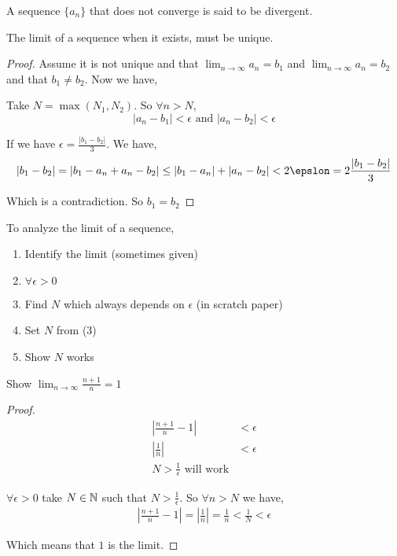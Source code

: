 \begin{definition}
    A sequence $\{a_n\}$ that does not converge is said to be divergent.
\end{definition}

\begin{theorem}
    The limit of a sequence when it exists, must be unique.
\end{theorem}
\begin{proof}
    Assume it is not unique and that $\lim_{n \to \infty} a_n = b_1$ and $\lim_{n \to \infty} a_n = b_2$ and that $b_1 \ne b_2$. Now we have, 


    Take $N = \max(N_1, N_2)$. So $\forall n > N$,
    $$ |a_n - b_1| < \epsilon \text{ and } |a_n - b_2| < \epsilon $$ 

    If we have $\epsilon = \frac{|b_1  - b_2|}{3}$. We have, 
    $$ |b_1 - b_2| = |b_1 - a_n + a_n - b_2| \le |b_1 - a_n| + |a_n - b_2| < 2\epslon = 2\frac{|b_1 - b_2|}{3}  $$ 

    Which is a contradiction. So $b_1 = b_2$
\end{proof}


\vspace{1em}
\begin{remark}
To analyze the limit of a sequence,
\begin{enumerate}
    \item Identify the limit (sometimes given)
    \item $\forall \epsilon > 0$  
    \item Find $N$ which always depends on $\epsilon$ (in scratch paper) 
    \item Set $N$ from  (3)
    \item Show $N$ works
\end{enumerate}
\end{remark}


\begin{eg}
    Show $\lim_{n \to \infty} \frac{n + 1}{n} = 1$
\end{eg}
\begin{proof}
     \begin{align*}
         |\frac{n + 1}{n} - 1 | &< \epsilon \\
         |\frac{ 1}{n} | &< \epsilon \\
         N > \frac{1}{\epsilon} \text{ will work}
     \end{align*}

     $\forall \epsilon > 0$  take $N \in \mathbb{N}$ such that $ N > \frac{1}{\epsilon}$. So $\forall n > N$ we have, 
      \begin{align*}
         |\frac{n + 1}{n} - 1| = |\frac{1}{n}| = \frac{1}{n} < \frac{1}{N} < \epsilon
     \end{align*}

     Which means that $1$ is the limit.
\end{proof}

